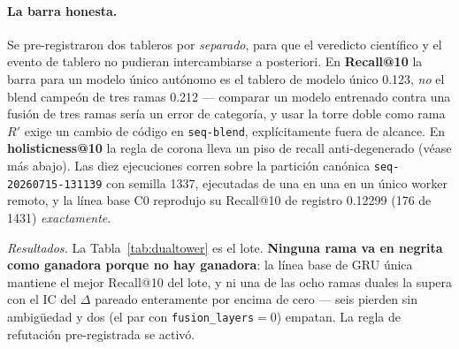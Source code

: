 \documentclass[11pt]{article}
\newcommand{\dsid}[1]{\texttt{\small #1}}
\newcommand{\Rp}{\ensuremath{R'}}
\begin{document}
\paragraph{La barra honesta.} Se pre-registraron dos tableros por
\emph{separado}, para que el veredicto científico y el evento de tablero no
pudieran intercambiarse a posteriori. En \textbf{Recall@10} la barra para un
modelo único autónomo es el tablero de modelo único \num{0.123}, \emph{no} el
blend campeón de tres ramas \num{0.212} --- comparar un modelo entrenado contra
una fusión de tres ramas sería un error de categoría, y usar la torre doble como
rama \Rp{} exige un cambio de código en \texttt{seq-blend}, explícitamente fuera
de alcance. En \textbf{holisticness@10} la regla de corona lleva un piso de
recall anti-degenerado (véase más abajo). Las diez ejecuciones corren sobre la
partición canónica \dsid{seq-20260715-131139} con semilla 1337, ejecutadas de una
en una en un único worker remoto, y la línea base C0 reprodujo su Recall@10 de
registro \num{0.12299} (\num{176} de \num{1431}) \emph{exactamente}.

\emph{Resultados.} La Tabla~\ref{tab:dualtower} es el lote. \textbf{Ninguna rama
va en negrita como ganadora porque no hay ganadora}: la línea base de GRU única
mantiene el mejor Recall@10 del lote, y ni una de las ocho ramas duales la supera
con el IC del $\Delta$ pareado enteramente por encima de cero --- seis pierden
sin ambigüedad y dos (el par con \texttt{fusion\_layers}${}=0$) empatan. La regla
de refutación pre-registrada se activó.
\end{document}
